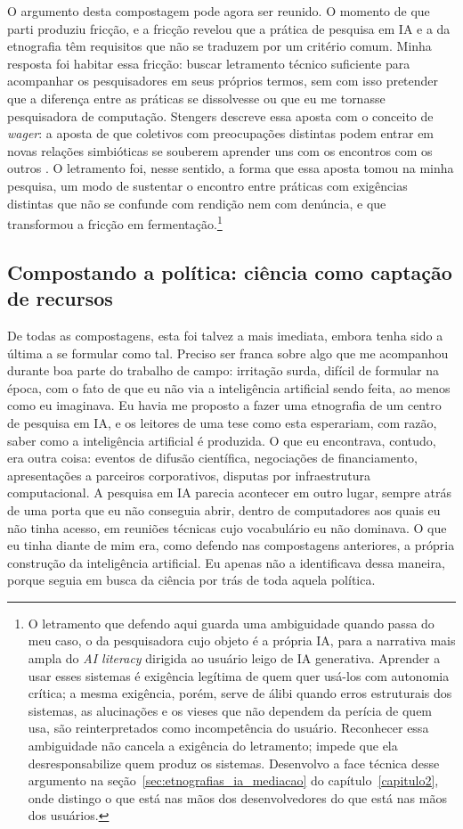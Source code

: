 O argumento desta compostagem pode agora ser reunido. O momento de que parti produziu fricção, e a fricção revelou que a prática de pesquisa em IA e a da etnografia têm requisitos que não se traduzem por um critério comum. Minha resposta foi habitar essa fricção: buscar letramento técnico suficiente para acompanhar os pesquisadores em seus próprios termos, sem com isso pretender que a diferença entre as práticas se dissolvesse ou que eu me tornasse pesquisadora de computação. Stengers descreve essa aposta com o conceito de \emph{wager}: a aposta de que coletivos com preocupações distintas podem entrar em novas relações simbióticas se souberem aprender uns com os encontros com os outros \parencite[p.~103--104]{stengers2018another}. O letramento foi, nesse sentido, a forma que essa aposta tomou na minha pesquisa, um modo de sustentar o encontro entre práticas com exigências distintas que não se confunde com rendição nem com denúncia, e que transformou a fricção em fermentação.\footnote{O letramento que defendo aqui guarda uma ambiguidade quando passa do meu caso, o da pesquisadora cujo objeto é a própria IA, para a narrativa mais ampla do \emph{AI literacy} dirigida ao usuário leigo de IA generativa. Aprender a usar esses sistemas é exigência legítima de quem quer usá-los com autonomia crítica; a mesma exigência, porém, serve de álibi quando erros estruturais dos sistemas, as alucinações e os vieses que não dependem da perícia de quem usa, são reinterpretados como incompetência do usuário. Reconhecer essa ambiguidade não cancela a exigência do letramento; impede que ela desresponsabilize quem produz os sistemas. Desenvolvo a face técnica desse argumento na seção~\ref{sec:etnografias_ia_mediacao} do capítulo~\ref{capitulo2}, onde distingo o que está nas mãos dos desenvolvedores do que está nas mãos dos usuários.}

\subsection{Compostando a política: ciência como captação de recursos}
\label{subsec:compostagem4}

De todas as compostagens, esta foi talvez a mais imediata, embora tenha sido a última a se formular como tal. Preciso ser franca sobre algo que me acompanhou durante boa parte do trabalho de campo: irritação surda, difícil de formular na época, com o fato de que eu não via a inteligência artificial sendo feita, ao menos como eu imaginava. Eu havia me proposto a fazer uma etnografia de um centro de pesquisa em IA, e os leitores de uma tese como esta esperariam, com razão, saber como a inteligência artificial é produzida. O que eu encontrava, contudo, era outra coisa: eventos de difusão científica, negociações de financiamento, apresentações a parceiros corporativos, disputas por infraestrutura computacional.
A pesquisa em IA parecia acontecer em outro lugar, sempre atrás de uma porta que eu não conseguia abrir, dentro de computadores aos quais eu não tinha acesso, em reuniões técnicas cujo vocabulário eu não dominava. O que eu tinha diante de mim era, como defendo nas compostagens anteriores, a própria construção da inteligência artificial. Eu apenas não a identificava dessa maneira, porque seguia em busca da ciência por trás de toda aquela política.

